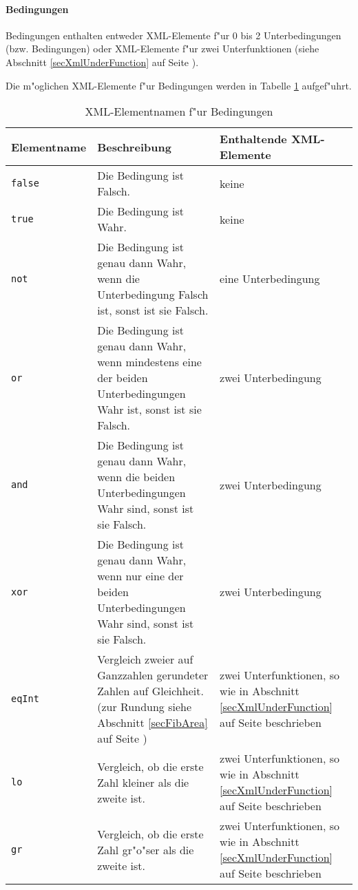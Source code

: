 \paragraph{Bedingungen}
\label{secXmlCondition}

Bedingungen enthalten entweder XML-Elemente f"ur 0 bis 2 Unterbedingungen (bzw. Bedingungen) oder XML-Elemente f"ur zwei Unterfunktionen (siehe Abschnitt \ref{secXmlUnderFunction} auf Seite \pageref{secXmlUnderFunction}).

Die m"oglichen XML-Elemente f"ur Bedingungen werden in Tabelle \ref{tableXmlConditions} aufgef"uhrt.

\begin{table}[htbp]
\begin{center}
\begin{tabular}{|p{15mm}|p{60mm}|p{40mm}|}\hline
	Ele\-ment\-name & Beschreibung & Enthaltende XML-Elemente \\\hline\hline
	\verb|false| & Die Bedingung ist Falsch. & keine \\\hline
	\verb|true| & Die Bedingung ist Wahr. & keine \\\hline
	\verb|not| & Die Bedingung ist genau dann Wahr, wenn die Unterbedingung Falsch ist, sonst ist sie Falsch. & eine Unterbedingung \\\hline
	\verb|or| & Die Bedingung ist genau dann Wahr, wenn mindestens eine der beiden Unterbedingungen Wahr ist, sonst ist sie Falsch. & zwei Unterbedingung \\\hline
	\verb|and| & Die Bedingung ist genau dann Wahr, wenn die beiden Unterbedingungen Wahr sind, sonst ist sie Falsch. & zwei Unterbedingung \\\hline
	\verb|xor| & Die Bedingung ist genau dann Wahr, wenn nur eine der beiden Unterbedingungen Wahr sind, sonst ist sie Falsch. & zwei Unterbedingung \\\hline

	\verb|eqInt| & Vergleich zweier auf Ganzzahlen gerundeter Zahlen auf Gleichheit. (zur Rundung siehe Abschnitt \ref{secFibArea} auf Seite \pageref{secFibArea}) & zwei Unterfunktionen, so wie in Abschnitt \ref{secXmlUnderFunction} auf Seite \pageref{secXmlUnderFunction} beschrieben\\\hline
	\verb|lo| & Vergleich, ob die erste Zahl kleiner als die zweite ist. & zwei Unterfunktionen, so wie in Abschnitt \ref{secXmlUnderFunction} auf Seite \pageref{secXmlUnderFunction} beschrieben \\\hline
	\verb|gr| & Vergleich, ob die erste Zahl gr"o"ser als die zweite ist. & zwei Unterfunktionen, so wie in Abschnitt \ref{secXmlUnderFunction} auf Seite \pageref{secXmlUnderFunction} beschrieben \\\hline

\end{tabular} 
\end{center}
\caption{XML-Elementnamen f"ur Bedingungen}
\label{tableXmlConditions}
\end{table}

